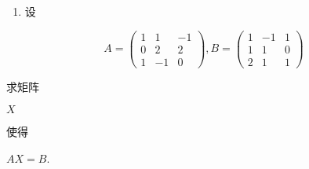 \documentclass[10pt]{article}
\begin{document}
\begin{enumerate}
  \item \begin{CJK}{UTF8}{mj}设\end{CJK}
\end{enumerate}
$$
A=\left(\begin{array}{ccc}
1 & 1 & -1 \\
0 & 2 & 2 \\
1 & -1 & 0
\end{array}\right), B=\left(\begin{array}{ccc}
1 & -1 & 1 \\
1 & 1 & 0 \\
2 & 1 & 1
\end{array}\right)
$$
\begin{CJK}{UTF8}{mj}求矩阵\end{CJK} $X$ \begin{CJK}{UTF8}{mj}使得\end{CJK} $A X=B$.
\end{document}
